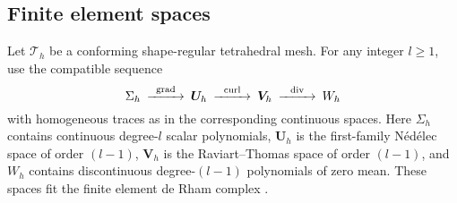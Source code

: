 \documentclass[11pt,a4paper]{article}
\newcommand{\bs}{\boldsymbol}
\DeclareMathOperator{\curl}{curl}
\DeclareMathOperator{\ddiv}{div}
\newcommand{\Div}{\ddiv}
\theoremstyle{definition}
\numberwithin{equation}{section}
\begin{document}
\subsection{Finite element spaces}
Let $\mathcal T_h$ be a conforming shape-regular tetrahedral mesh. For any integer $l\ge 1$, use the compatible sequence
\begin{equation}\label{eq:commuting-exact-sequence}
\begin{CD}
\Sigma_h
@>{\operatorname{grad}}>>
\bs U_h
@>{\operatorname{curl}}>>
\bs V_h
@>{\operatorname{div}}>>
W_h
\end{CD}
\end{equation}
%
%
with homogeneous traces as in the corresponding continuous spaces. Here $\Sigma_h$ contains continuous degree-$l$ scalar polynomials, $\bs U_h$ is the first-family N\'ed\'elec space of order $(l-1)$, $\bs V_h$ is the Raviart--Thomas space of order $(l-1)$, and $W_h$ contains discontinuous degree-$(l-1)$ polynomials of zero mean. 
These spaces fit the finite element de Rham complex \cite{Nedelec1980,RaviartThomas1977,ArnoldFalkWinther2006,ArnoldFalkWinther2010}.
\end{document}
